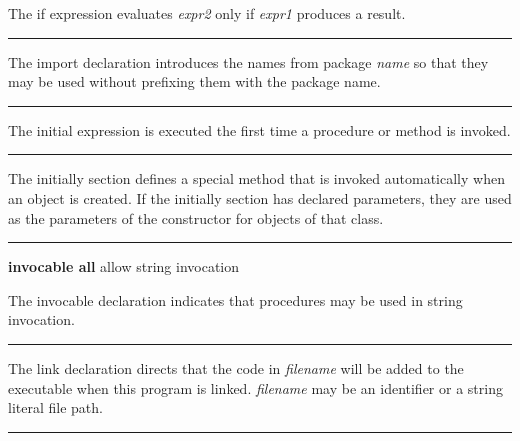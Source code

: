 \noindent
{}The \textsf{if} expression evaluates \textit{expr2} only if
\textit{expr1} produces a result.

\bigskip\hrule\vspace{0.1cm}

\noindent
{}The \textsf{import} declaration introduces the names from
package \textit{name} so that they may be used without prefixing them
with the package name.

\bigskip\hrule\vspace{0.1cm}

\noindent
{}The \textsf{initial} expression is executed the first
time a procedure or method is invoked.

\bigskip\hrule\vspace{0.1cm}

\noindent
{}The \textsf{initially} section defines a special method
that is invoked automatically when an object is created. If the
\textsf{initially} section has declared parameters, they are used as
the parameters of the constructor for objects
of that class.

\bigskip\hrule\vspace{0.1cm}

\noindent
{}
{\textbf{invocable all} \hfill allow string invocation}

\noindent
The \textsf{invocable} declaration indicates that procedures may be used
in string invocation.

\bigskip\hrule\vspace{0.1cm}

\noindent
The \textsf{link} declaration directs that the code in
\textit{filename} will be added to the executable when this program is
linked. \textit{filename} may be an identifier or a string literal file
path.

\bigskip\hrule\vspace{0.1cm}

